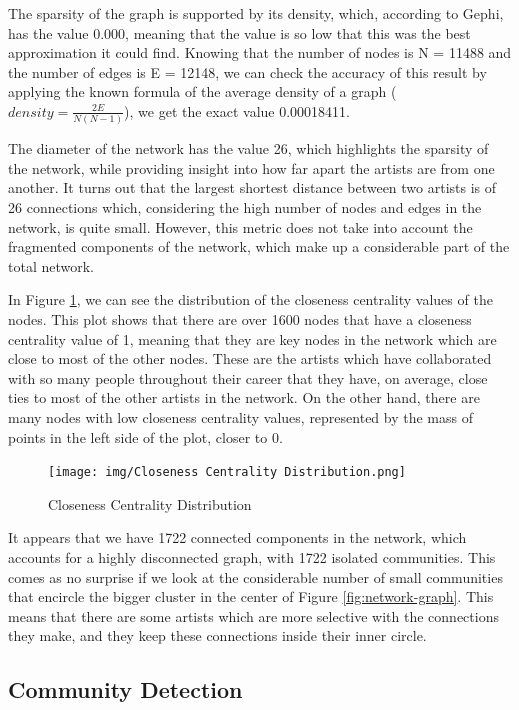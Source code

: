 \documentclass[sigchi]{acmart}
\begin{document}
The sparsity of the graph is supported by its density, which, according to Gephi, has the value 0.000, meaning that the value is so low that this was the best approximation it could find. Knowing that the number of nodes is N = 11488 and the number of edges is E = 12148, we can check the accuracy of this result by applying the known formula of the average density of a graph ($density = \frac{2E}{N(N-1)}$), we get the exact value 0.00018411.

The diameter of the network has the value 26, which highlights the sparsity of the network, while providing insight into how far apart the artists are from one another. It turns out that the largest shortest distance between two artists is of 26 connections which, considering the high number of nodes and edges in the network, is quite small. However, this metric does not take into account the fragmented components of the network, which make up a considerable part of the total network. 

In Figure \ref{fig:closeness-centrality}, we can see the distribution of the closeness centrality values of the nodes. This plot shows that there are over 1600 nodes that have a closeness centrality value of 1, meaning that they are key nodes in the network which are close to most of the other nodes. These are the artists which have collaborated with so many people throughout their career that they have, on average, close ties to most of the other artists in the network. On the other hand, there are many nodes with low closeness centrality values, represented by the mass of points in the left side of the plot, closer to 0.

\begin{figure}[h!]
  \centering
  \texttt{[image: img/Closeness Centrality Distribution.png]}
  \caption{Closeness Centrality Distribution}
  \label{fig:closeness-centrality}
\end{figure}

It appears that we have 1722 connected components in the network, which accounts for a highly disconnected graph, with 1722 isolated communities. This comes as no surprise if we look at the considerable number of small communities that encircle the bigger cluster in the center of Figure \ref{fig:network-graph}. This means that there are some artists which are more selective with the connections they make, and they keep these connections inside their inner circle.

\subsection{Community Detection}
\end{document}
